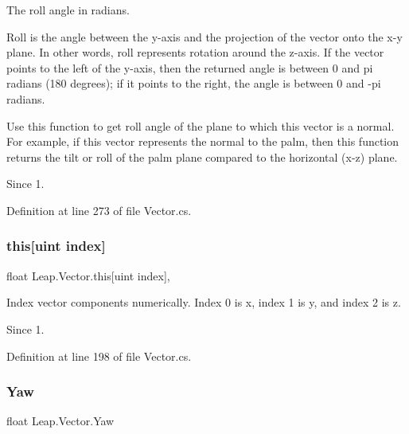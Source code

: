 The roll angle in radians. 

Roll is the angle between the y-\/axis and the projection of the vector onto the x-\/y plane. In other words, roll represents rotation around the z-\/axis. If the vector points to the left of the y-\/axis, then the returned angle is between 0 and pi radians (180 degrees); if it points to the right, the angle is between 0 and -\/pi radians.

Use this function to get roll angle of the plane to which this vector is a normal. For example, if this vector represents the normal to the palm, then this function returns the tilt or roll of the palm plane compared to the horizontal (x-\/z) plane.

\begin{DoxySince}{Since}
1. 
\end{DoxySince}


Definition at line 273 of file Vector.\+cs.

\mbox{\label{struct_leap_1_1_vector_af92a9eb06277dd8eebbf3e1cf61360ca}} 
\subsubsection{\texorpdfstring{this[uint index]}{this[uint index]}}
{\footnotesize\ttfamily float Leap.\+Vector.\+this\mbox{[}uint index\mbox{]}\hspace{0.3cm}{\ttfamily [get]}, {\ttfamily [set]}}



Index vector components numerically. Index 0 is x, index 1 is y, and index 2 is z. 

\begin{DoxySince}{Since}
1. 
\end{DoxySince}


Definition at line 198 of file Vector.\+cs.

\mbox{\label{struct_leap_1_1_vector_ac6f5feaf332862e1ebc0d5b219e55eaa}} 
\subsubsection{\texorpdfstring{Yaw}{Yaw}}
{\footnotesize\ttfamily float Leap.\+Vector.\+Yaw\hspace{0.3cm}{\ttfamily [get]}}



